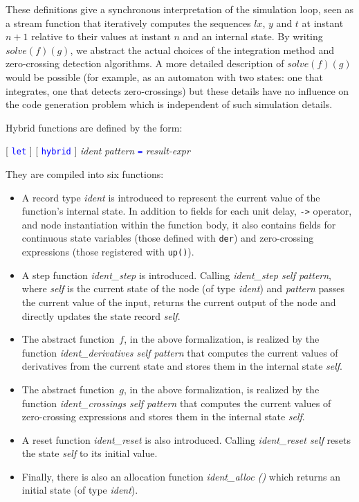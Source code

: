 \documentclass[11pt,titlepage,twoside]{report}
\makeatletter
\newcommand{\zls}[1]{{\@span{class="zelusinline"}#1}}
\newcommand{\zls}[1]{\texttt{#1}}
\renewcommand{\zls}[1]{\texttt{#1}}
\newenvironment{flatitemize}
  {\setenvclass{itemize}{flatitemize}%
   \begin{itemize}}
  {\end{itemize}}
\newenvironment{flatitemize}
  {\begin{itemize}[leftmargin=*]}
  {\end{itemize}}
\newcommand{\lx}{\ensuremath{\mathit{lx}}}
\newcommand{\Solve}[2]{\mathit{solve}({#1})({#2})}
\newcommand{\term}[1]{\textcolor{Blue}{\tt #1}}
\newcommand{\nterm}[1]{\textcolor{BrickRed}{\it #1}}
\newcommand{\term}[1]{{\tt #1}}
\newcommand{\nterm}[1]{{\em #1}}
\makeatother
\begin{document}
These definitions give a synchronous interpretation of the simulation loop,
seen as a stream function that iteratively computes the sequences $\lx$, $y$ 
and $t$ at instant $n+1$ relative to their values at instant $n$ and an
internal state. By writing $\Solve{f}{g}$, we abstract the
actual choices of the integration method and zero-crossing detection
algorithms. A more detailed description of $\Solve{f}{g}$ would be
possible (for example, as an automaton with two states: one that integrates, 
one that detects zero-crossings) but these details have no influence on
the code generation problem which is independent of such simulation
details.

Hybrid functions are defined by the form:
\begin{center}
  [ \term{let} ] [ \term{hybrid} ] \nterm{ident} \nterm{pattern} \term{=}
  \nterm{result-expr}
\end{center}

\medskip\noindent
They are compiled into six functions:
\begin{flatitemize}
\item
A record type \nterm{ident} is introduced to represent the current value of 
the function's internal state.
In addition to fields for each unit delay, \zls{->} operator, and node 
instantiation within the function body, it also contains fields for 
continuous state variables (those defined with \zls{der}) and zero-crossing 
expressions (those registered with \zls{up()}).

\item
A step function \nterm{ident\_step} is introduced.
Calling \nterm{ident\_step self pattern}, where \nterm{self} is the current 
state of the node (of type \nterm{ident}) and \nterm{pattern} passes the 
current value of the input, returns the current output of the node and 
directly updates the state record \nterm{self}.

\item
The abstract function~$f$, in the above formalization, is realized by the 
function \nterm{ident\_derivatives self pattern} that computes the current 
values of derivatives from the current state and stores them in the internal 
state \nterm{self}.

\item
The abstract function~$g$, in the above formalization, is realized by the 
function \nterm{ident\_crossings self pattern} that computes the current 
values of zero-crossing expressions and stores them in the internal state 
\nterm{self}.

\item
A reset function \nterm{ident\_reset} is also introduced.
Calling \nterm{ident\_reset self} resets the state \nterm{self} to its 
initial value.

\item
Finally, there is also an allocation function \nterm{ident\_alloc ()} which 
returns an initial state (of type \nterm{ident}).
\end{flatitemize}
\end{document}
